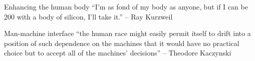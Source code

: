 \documentclass{beamer}
\begin{document}
\begin{frame}{Enhancing the human body}
``I'm as fond of my body as anyone, but if I can be 200 with a body of silicon, I'll take it.'' -- Ray Kurzweil \\
\bigskip
\href{http://www.youtube.com/watch?v=mO0xNI3xpmE}{}
\end{frame}

\begin{frame}{Man-machine interface}
``the human race might easily permit itself to drift into a position of such dependence on the machines that it would have no practical choice but to accept all of the machines' decisions'' -- Theodore Kaczynski \\
\bigskip
\href{https://www.youtube.com/watch?v=ogBX18maUiM}{}
\end{frame}
\end{document}

